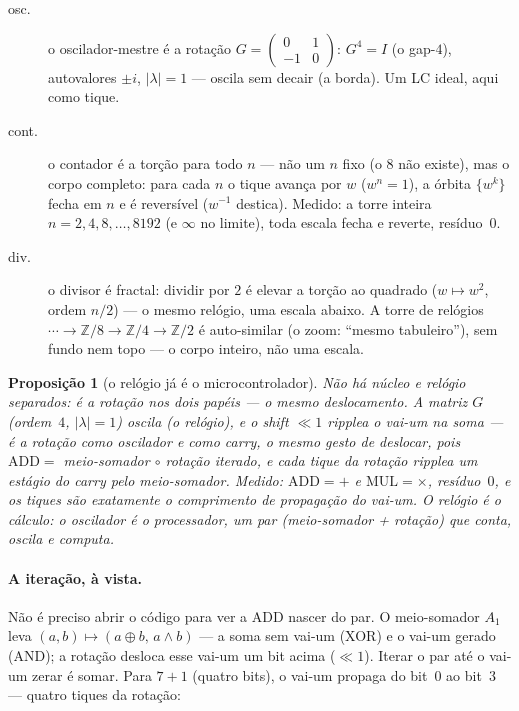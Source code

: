 \documentclass[11pt,a4paper]{article}
\newtheorem{proposicao}{Proposição}
\begin{document}
\begin{description}
\item[osc.]
o oscilador-mestre é a rotação
$G=\begin{pmatrix}0&1\\-1&0\end{pmatrix}$: $G^{4}=I$ (o gap-$4$), autovalores $\pm i$, $|\lambda|=1$
--- oscila sem decair (a borda). Um LC ideal, aqui como tique.

\item[cont.]
o contador é a torção para todo $n$ --- não um $n$ fixo (o $8$ não existe), mas o corpo
completo: para cada $n$ o tique avança por $w$ ($w^{n}=1$), a órbita $\{w^{k}\}$ fecha em $n$ e é
reversível ($w^{-1}$ destica). Medido: a torre inteira $n=2,4,8,\ldots,8192$ (e $\infty$ no limite),
toda escala fecha e reverte, resíduo~$0$.

\item[div.]
o divisor é fractal: dividir por $2$ é elevar a torção ao quadrado ($w\mapsto w^{2}$, ordem $n/2$)
--- o mesmo relógio, uma escala abaixo. A torre de relógios $\cdots\to\mathbb{Z}/8\to\mathbb{Z}/4\to\mathbb{Z}/2$ é
auto-similar (o zoom: ``mesmo tabuleiro''), sem fundo nem topo --- o corpo inteiro, não uma escala.
\end{description}

\begin{proposicao}[o relógio já é o microcontrolador]
Não há núcleo e relógio separados: é a rotação nos dois papéis --- o mesmo deslocamento.
A matriz $G$ (ordem~$4$, $|\lambda|=1$) oscila (o relógio), e o shift $\ll 1$ ripplea o vai-um na soma ---
é a rotação como oscilador e como carry, o mesmo gesto de deslocar, pois
$\mathrm{ADD}=$ meio-somador $\circ$ rotação iterado, e cada tique da rotação ripplea um estágio do carry
pelo meio-somador. Medido: $\mathrm{ADD}=+$ e $\mathrm{MUL}=\times$, resíduo~$0$, e os tiques
são exatamente o comprimento de propagação do vai-um. O relógio é o cálculo: o oscilador é o
processador, um par (meio-somador + rotação) que conta, oscila e computa.
\end{proposicao}

\paragraph{A iteração, à vista.}
Não é preciso abrir o código para ver a ADD nascer do par. O meio-somador $A_{1}$ leva
$(a,b)\mapsto(a\oplus b,\,a\land b)$ --- a soma sem vai-um (XOR) e o vai-um gerado (AND);
a rotação desloca esse vai-um um bit acima ($\ll 1$). Iterar o par até o vai-um zerar é somar.
Para $7+1$ (quatro bits), o vai-um propaga do bit~$0$ ao bit~$3$ --- quatro tiques da rotação:
\end{document}
